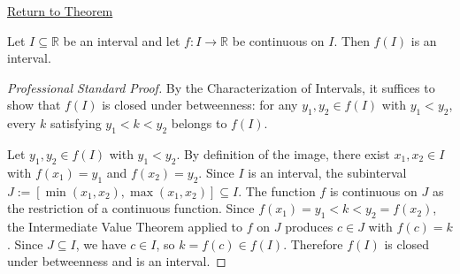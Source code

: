 \newpage
{}
\label{prf:preservation-of-intervals}

\begin{remark*}[Return]
\hyperref[thm:preservation-of-intervals]{Return to Theorem}
\end{remark*}

\begin{theorem*}
Let $I \subseteq \mathbb{R}$ be an interval and let $f : I \to \mathbb{R}$ be continuous on $I$. Then $f(I)$ is an interval.
\end{theorem*}

\begin{proof}[Professional Standard Proof]
\LRAProofBodyStart
By the Characterization of Intervals, it suffices to show that $f(I)$ is closed under betweenness: for any $y_1, y_2 \in f(I)$ with $y_1 < y_2$, every $k$ satisfying $y_1 < k < y_2$ belongs to $f(I)$.

Let $y_1, y_2 \in f(I)$ with $y_1 < y_2$. By definition of the image, there exist $x_1, x_2 \in I$ with $f(x_1) = y_1$ and $f(x_2) = y_2$. Since $I$ is an interval, the subinterval $J := [\min(x_1, x_2), \max(x_1, x_2)] \subseteq I$. The function $f$ is continuous on $J$ as the restriction of a continuous function. Since $f(x_1) = y_1 < k < y_2 = f(x_2)$, the Intermediate Value Theorem applied to $f$ on $J$ produces $c \in J$ with $f(c) = k$. Since $J \subseteq I$, we have $c \in I$, so $k = f(c) \in f(I)$. Therefore $f(I)$ is closed under betweenness and is an interval.
\end{proof}

